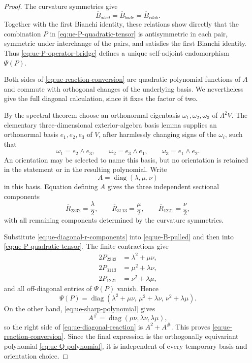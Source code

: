 \documentclass[10pt]{coll-l}
\theoremstyle{definition}
\theoremstyle{remark}
\numberwithin{section}{chapter}
\numberwithin{equation}{chapter}
\begin{document}
\begin{proof}
The curvature symmetries give
\[
       \overline B_{abcd}=\overline B_{badc}
          =\overline B_{cdab}.
\]
Together with the first Bianchi identity, these relations show directly
that the combination $P$ in \eqref{eq:ue-P-quadratic-tensor} is
antisymmetric in each pair, symmetric under interchange of the pairs, and
satisfies the first Bianchi identity.  Thus
\eqref{eq:ue-P-operator-bridge} defines a unique self-adjoint endomorphism
$\Psi(P)$.

Both sides of \eqref{eq:ue-reaction-conversion} are quadratic polynomial
functions of $A$ and commute with orthogonal changes of the underlying
basis.  We nevertheless give the full diagonal calculation, since it fixes
the factor of two.

By the spectral theorem choose an orthonormal eigenbasis
$\omega_1,\omega_2,\omega_3$ of $\Lambda^2V$.  The elementary
three-dimensional exterior-algebra basis lemma supplies an orthonormal
basis $e_1,e_2,e_3$ of $V$, after harmlessly changing signs of the
$\omega_i$, such that
\[
       \omega_1=e_2\wedge e_3,\qquad
       \omega_2=e_3\wedge e_1,\qquad
       \omega_3=e_1\wedge e_2.
\]
An orientation may be selected to name this basis, but no orientation is
retained in the statement or in the resulting polynomial.  Write
\[
              A=\operatorname{diag}(\lambda,\mu,\nu)
\]
in this basis.  Equation defining $A$ gives the three independent
sectional components
\begin{equation}
 \overline R_{2332}=\frac\lambda2,\qquad
 \overline R_{3113}=\frac\mu2,\qquad
 \overline R_{1221}=\frac\nu2,                           \label{eq:ue-diagonal-r-components}
\end{equation}
with all remaining components determined by the curvature symmetries.

Substitute \eqref{eq:ue-diagonal-r-components} into
\eqref{eq:ue-B-pulled} and then into
\eqref{eq:ue-P-quadratic-tensor}.  The finite contractions give
\begin{align}
 2P_{2332}&=\lambda^2+\mu\nu,                            \label{eq:ue-P-lambda}\\
 2P_{3113}&=\mu^2+\lambda\nu,                            \label{eq:ue-P-mu}\\
 2P_{1221}&=\nu^2+\lambda\mu,                            \label{eq:ue-P-nu}
\end{align}
and all off-diagonal entries of $\Psi(P)$ vanish.  Hence
\begin{equation}
 \Psi(P)=\operatorname{diag}
    (\lambda^2+\mu\nu,\,
     \mu^2+\lambda\nu,\,
     \nu^2+\lambda\mu).                                \label{eq:ue-diagonal-reaction}
\end{equation}
On the other hand, \eqref{eq:ue-sharp-polynomial} gives
\[
        A^\#=\operatorname{diag}(\mu\nu,\lambda\nu,\lambda\mu),
\]
so the right side of \eqref{eq:ue-diagonal-reaction} is $A^2+A^\#$.
This proves \eqref{eq:ue-reaction-conversion}.  Since the final expression
is the orthogonally equivariant polynomial
\eqref{eq:ue-Q-polynomial}, it is independent of every temporary basis and
orientation choice.
\end{proof}
\end{document}
